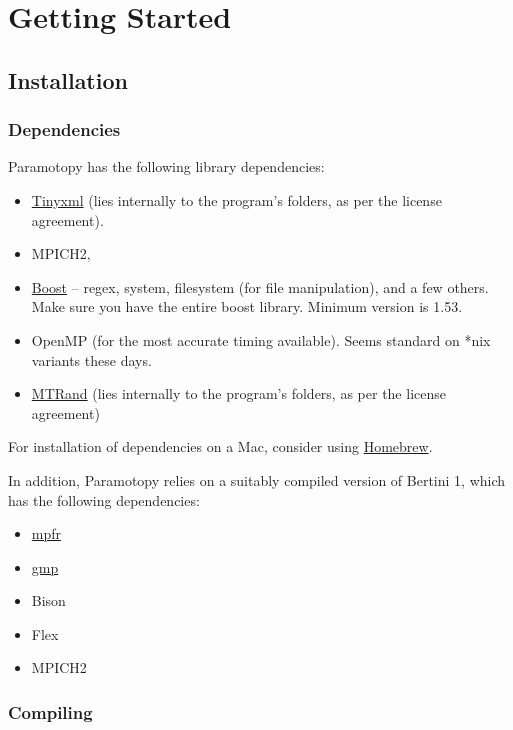 \clearpage
\section{Getting Started}
\label{sec:started}

\subsection{Installation}

\subsubsection{Dependencies}

Paramotopy has the following library dependencies: 
\begin{itemize}
\item \href{http://sourceforge.net/projects/tinyxml/}{Tinyxml}  (lies internally to the program's folders, as per the license agreement).
\item MPICH2,
\item  \href{http://www.boost.org/}{Boost} -- regex, system, filesystem (for file manipulation), and a few others.  Make sure you have the entire boost library.  Minimum version is 1.53.
\item OpenMP (for the most accurate timing available).  Seems standard on *nix variants these days.
\item \href{http://www.bedaux.net/mtrand/}{MTRand} (lies internally to the program's folders, as per the license agreement)
\end{itemize}
\noindent For installation of dependencies on a Mac, consider using \href{http://mxcl.github.io/homebrew/}{Homebrew}.
\vspace{10mm}

\noindent In addition, Paramotopy relies on a suitably compiled version of Bertini 1, which has the following dependencies:
\begin{itemize}
\item \href{http://www.mpfr.org/}{mpfr} 
\item \href{http://gmplib.org/}{gmp}
\item Bison
\item Flex
\item MPICH2
\end{itemize}


\subsubsection{Compiling}


